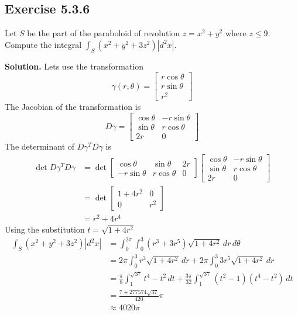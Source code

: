 \documentclass[12pt]{article}
\begin{document}
\subsection*{Exercise 5.3.6}
Let $S$ be the part of the paraboloid of revolution $z= x^2+y^2$ where $z\leq 9$. Compute the integral $\int_S(x^2+y^2+3z^2)|d^2x|$.

\medskip

\textbf{Solution.}
Lets use the transformation 
\[
  \gamma(r,\theta) = 
  \begin{bmatrix}
    r\cos \theta \\
    r\sin \theta \\ 
    r^2
  \end{bmatrix}
\]
The Jacobian of the transformation is 
\[
  D\gamma = 
  \begin{bmatrix}
    \cos \theta &  -r\sin \theta\\
    \sin\theta & r\cos \theta \\
    2r & 0
  \end{bmatrix}
\]
The determinant of $D\gamma^T D\gamma$ is 
\begin{align*}
   \det D\gamma^T D\gamma 
   &= \det \begin{bmatrix}
    \cos \theta & \sin \theta & 2r \\
    -r\sin \theta & r\cos \theta & 0
  \end{bmatrix}
  \begin{bmatrix}
    \cos \theta &  -r\sin \theta\\
    \sin\theta & r\cos \theta \\
    2r & 0
  \end{bmatrix} \\
  &= \det \begin{bmatrix}
    1+4r^2 & 0 \\
    0 & r^2
  \end{bmatrix} \\ 
  &= r^2 + 4r^4
\end{align*}
Using the substitution $t = \sqrt{1+4r^2}$
\begin{align*}
  \int_S(x^2+y^2+3z^2)|d^2x|
  &= \int_0^{2\pi} \int_0^{3} (r^3+3r^5)\sqrt{1 + 4r^2} \,dr \,d\theta \\
  &= 2\pi \int_0^{3} r^3\sqrt{1 + 4r^2} \,dr
    + 2\pi \int_0^{3} 3r^5\sqrt{1 + 4r^2} \,dr \\
  &= \frac{\pi}{8} \int_1^{\sqrt{37}} t^4-t^2 \,dt
    + \frac{3\pi}{32} \int_1^{\sqrt{37}} (t^2-1)(t^4-t^2) \,dt \\
  &= \frac{7+277574\sqrt{37}}{420}\pi \\
  &\approx 4020 \pi
\end{align*}
\end{document}
